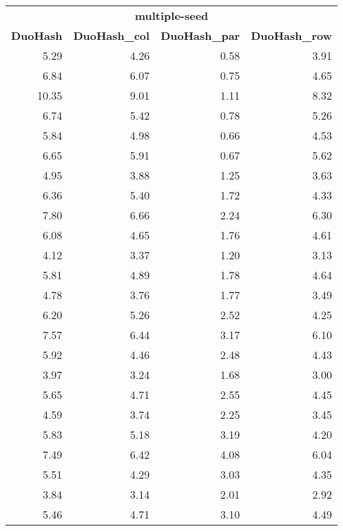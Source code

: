 \section*{\phantom{A}}
\begin{table}[!ht]
	\begin{tabular}{rrrr}
		\multicolumn{4}{c}{\textbf{multiple-seed}} \\
		\textbf{DuoHash} & \textbf{DuoHash\_col} & \textbf{DuoHash\_par} & \textbf{DuoHash\_row} \\
		\toprule
		5.29 & 4.26 & 0.58 & 3.91 \\
		6.84 & 6.07 & 0.75 & 4.65 \\
		10.35 & 9.01 & 1.11 & 8.32 \\
		6.74 & 5.42 & 0.78 & 5.26 \\
		5.84 & 4.98 & 0.66 & 4.53 \\
		6.65 & 5.91 & 0.67 & 5.62 \\
		\midrule
		4.95 & 3.88 & 1.25 & 3.63 \\
		6.36 & 5.40 & 1.72 & 4.33 \\
		7.80 & 6.66 & 2.24 & 6.30 \\
		6.08 & 4.65 & 1.76 & 4.61 \\
		4.12 & 3.37 & 1.20 & 3.13 \\
		5.81 & 4.89 & 1.78 & 4.64 \\
		\midrule
		4.78 & 3.76 & 1.77 & 3.49 \\
		6.20 & 5.26 & 2.52 & 4.25 \\
		7.57 & 6.44 & 3.17 & 6.10 \\
		5.92 & 4.46 & 2.48 & 4.43 \\
		3.97 & 3.24 & 1.68 & 3.00 \\
		5.65 & 4.71 & 2.55 & 4.45 \\
		\midrule
		4.59 & 3.74 & 2.25 & 3.45 \\
		5.83 & 5.18 & 3.19 & 4.20 \\
		7.49 & 6.42 & 4.08 & 6.04 \\
		5.51 & 4.29 & 3.03 & 4.35 \\
		3.84 & 3.14 & 2.01 & 2.92 \\
		5.46 & 4.71 & 3.10 & 4.49 \\
		\bottomrule
	\end{tabular}
\end{table}
\clearpage




